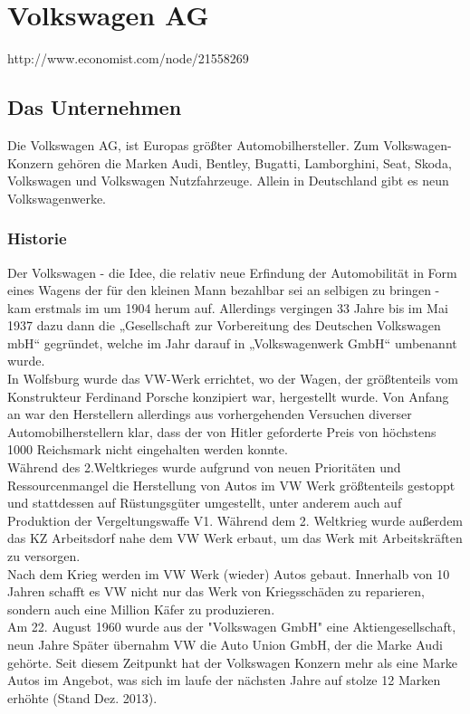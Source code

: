 \documentclass[12pt]{article}
\begin{document}
\section{Volkswagen AG}
http://www.economist.com/node/21558269
\subsection{Das Unternehmen}
Die Volkswagen AG, ist Europas größter Automobilhersteller. Zum Volkswagen-Konzern gehören die Marken Audi, Bentley, Bugatti, Lamborghini, Seat, Skoda, Volkswagen und Volkswagen Nutzfahrzeuge. Allein in Deutschland gibt es neun Volkswagenwerke.

\subsubsection{Historie}
Der Volkswagen - die Idee, die relativ neue Erfindung der Automobilität in Form eines Wagens der für den kleinen Mann bezahlbar sei an selbigen zu bringen - kam erstmals im um 1904 herum auf. Allerdings vergingen 33 Jahre bis im Mai 1937 dazu dann die „Gesellschaft zur Vorbereitung des Deutschen Volkswagen mbH“ gegründet, welche im Jahr darauf in „Volkswagenwerk GmbH“ umbenannt wurde. \\
In Wolfsburg wurde das VW-Werk errichtet, wo der Wagen, der größtenteils vom Konstrukteur Ferdinand Porsche konzipiert war, hergestellt wurde. Von Anfang an war den Herstellern allerdings aus vorhergehenden Versuchen diverser Automobilherstellern klar, dass der von Hitler geforderte Preis von höchstens 1000 Reichsmark nicht eingehalten werden konnte. \cite{geschdautos}\\
Während des 2.Weltkrieges wurde aufgrund von neuen Prioritäten und Ressourcenmangel die Herstellung von Autos im VW Werk größtenteils gestoppt und stattdessen auf Rüstungsgüter umgestellt, unter anderem auch auf Produktion der Vergeltungswaffe V1.\cite{autowp} Während dem 2. Weltkrieg wurde außerdem das KZ Arbeitsdorf nahe dem VW Werk erbaut, um das Werk mit Arbeitskräften zu versorgen.\cite{terror}  
\\
Nach dem Krieg werden im VW Werk (wieder) Autos gebaut. Innerhalb von 10 Jahren schafft es VW nicht nur das Werk von Kriegsschäden zu reparieren, sondern auch eine Million Käfer zu produzieren. \cite{ahwest}\\
Am 22. August 1960 wurde aus der "Volkswagen GmbH" eine Aktiengesellschaft, neun Jahre Später übernahm VW die Auto Union GmbH, der die Marke Audi gehörte. Seit diesem Zeitpunkt hat der Volkswagen Konzern mehr als eine Marke Autos im Angebot, was sich im laufe der nächsten Jahre auf stolze 12 Marken erhöhte (Stand Dez. 2013). \cite{vwag}
\end{document}
